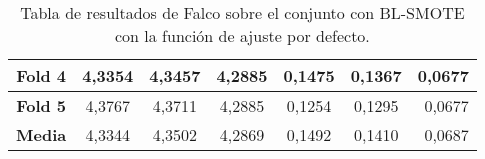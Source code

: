 \begin{table}[H]
{\begin{tabular}{|crrrrrr|}
\multicolumn{1}{|c|}{\textbf{Fold 4}} & \multicolumn{1}{c|}{4,3354}            & \multicolumn{1}{c|}{4,3457}              & \multicolumn{1}{c|}{4,2885}          & \multicolumn{1}{c|}{0,1475}            & \multicolumn{1}{c|}{0,1367}              & 0,0677                             \\ \hline
\multicolumn{1}{|c|}{\textbf{Fold 5}} & \multicolumn{1}{c|}{4,3767}            & \multicolumn{1}{c|}{4,3711}              & \multicolumn{1}{c|}{4,2885}          & \multicolumn{1}{c|}{0,1254}            & \multicolumn{1}{c|}{0,1295}              & 0,0677                             \\ \hline
\multicolumn{1}{|c|}{\textbf{Media}}  & \multicolumn{1}{c|}{4,3344}           & \multicolumn{1}{c|}{4,3502}             & \multicolumn{1}{c|}{4,2869}         & \multicolumn{1}{c|}{0,1492}           & \multicolumn{1}{c|}{0,1410}             & 0,0687                            \\ \hline
\end{tabular}%
}
\caption{Tabla de resultados de Falco sobre el conjunto con BL-SMOTE con la función de ajuste por defecto.}\label{tablaFALCOconBLSMOTEdefecto}

\end{table}

